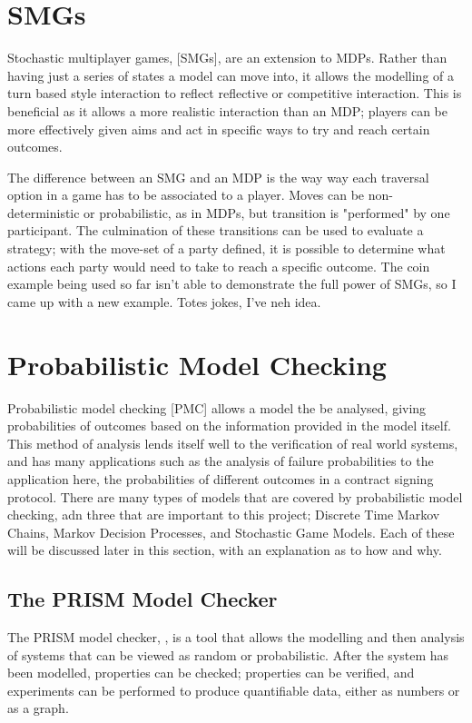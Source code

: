 \documentclass{l4proj}
\begin{document}
\section{SMGs}


Stochastic multiplayer games, [SMGs], are an extension to MDPs. Rather than having just a series of states a model can move into, it allows the modelling of a turn based style interaction to reflect reflective or competitive interaction. This is beneficial as it allows a more realistic interaction than an MDP; players can be more effectively given aims and act in specific ways to try and reach certain outcomes. 

The difference between an SMG and an MDP is the way way each traversal option in a game has to be associated to a player. Moves can be non-deterministic or probabilistic, as in MDPs, but transition is "performed" by one participant. The culmination of these transitions can be used to evaluate a strategy; with the move-set of a party defined, it is possible to determine what actions each party would need to take to reach a specific outcome. The coin example being used so far isn't able to demonstrate the full power of SMGs, so I came up with a new example. Totes jokes, I've neh idea.

\section{Probabilistic Model Checking}


Probabilistic model checking [PMC] allows a model the be analysed, giving probabilities of outcomes based on the information provided in the model itself. This method of analysis lends itself well to the verification of real world systems, and has many applications such as the analysis of failure probabilities to the application here, the probabilities of different outcomes in a contract signing protocol. There are many types of models that are covered by probabilistic model checking, adn three that are important to this project; Discrete Time Markov Chains, Markov Decision Processes, and Stochastic Game Models. Each of these will be discussed later in this section, with an explanation as to how and why.

\subsection{The PRISM Model Checker}

The PRISM model checker, \cite{Pri}, is a tool that allows the modelling and then analysis of systems that can be viewed as random or probabilistic. After the system has been modelled, properties can be checked; properties can be verified, and experiments can be performed to produce quantifiable data, either as numbers or as a graph. 
\end{document}
